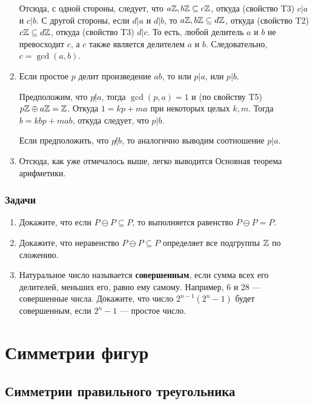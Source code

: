 \begin{enumerate}[T1]
Отсюда, с одной стороны, следует, что $a\mathbb Z,b\mathbb Z\subseteq c\mathbb Z$, откуда (свойство T3) $c|a$ и $c|b$. С другой стороны, если $d|a$ и $d|b$, то $a\mathbb Z,b\mathbb Z\subseteq d\mathbb Z$, откуда (свойство T2) $c\mathbb Z\subseteq d\mathbb Z$, откуда (свойство T3) $d|c$. То есть, любой делитель $a$ и $b$ не превосходит $c$, а $c$ также является делителем $a$ и $b$. Следовательно, $c=\gcd(a,b)$.

\item Если простое $p$ делит произведение $ab$, то или $p|a$, или $p|b$.

Предположим, что $p\not|a$, тогда $\gcd(p,a)=1$ и (по свойству T5) $p\mathbb Z\oplus a\mathbb Z=\mathbb Z$. Откуда $1=kp+ma$ при некоторых целых $k,m$. Тогда $b=kbp+mab$, откуда следует, что $p|b$.

Если предположить, что $p\not|b$, то аналогично выводим соотношение $p|a$.
\item Отсюда, как уже отмечалось выше, легко выводится Основная теорема арифметики.
\end{enumerate}


\subsection*{Задачи}
\begin{enumerate}
\item Докажите, что если $P\ominus P\subseteq P$, то выполняется равенство $P\ominus P=P$.
\item Докажите, что неравенство $P\ominus P\subseteq P$ определяет все подгруппы $\mathbb Z$ по сложению.
\item Натуральное число называется \textbf{совершенным}, если сумма всех его делителей, меньших его, равно ему самому. Например, 6 и 28 --- совершенные числа. Докажите, что число $2^{n-1}(2^n-1)$ будет совершенным, если $2^n-1$ --- простое число.
\end{enumerate}



\chapter{Симметрии фигур}


\section{Симметрии правильного треугольника}

